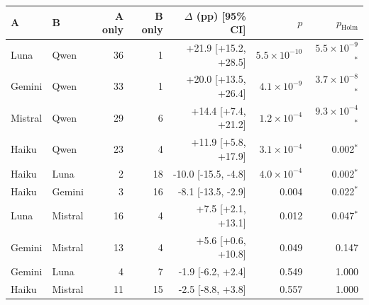 \begin{tabular}{@{}llrrrrr@{}}
\toprule
A & B & A only & B only & $\Delta$ (pp) [95\% CI] & $p$ & $p_\mathrm{Holm}$ \\
\midrule
Luna & Qwen & 36 & 1 & +21.9 [+15.2, +28.5] & $5.5\times10^{-10}$ & $5.5\times10^{-9}$$^{*}$ \\
Gemini & Qwen & 33 & 1 & +20.0 [+13.5, +26.4] & $4.1\times10^{-9}$ & $3.7\times10^{-8}$$^{*}$ \\
Mistral & Qwen & 29 & 6 & +14.4 [+7.4, +21.2] & $1.2\times10^{-4}$ & $9.3\times10^{-4}$$^{*}$ \\
Haiku & Qwen & 23 & 4 & +11.9 [+5.8, +17.9] & $3.1\times10^{-4}$ & 0.002$^{*}$ \\
Haiku & Luna & 2 & 18 & -10.0 [-15.5, -4.8] & $4.0\times10^{-4}$ & 0.002$^{*}$ \\
Haiku & Gemini & 3 & 16 & -8.1 [-13.5, -2.9] & 0.004 & 0.022$^{*}$ \\
Luna & Mistral & 16 & 4 & +7.5 [+2.1, +13.1] & 0.012 & 0.047$^{*}$ \\
Gemini & Mistral & 13 & 4 & +5.6 [+0.6, +10.8] & 0.049 & 0.147 \\
Gemini & Luna & 4 & 7 & -1.9 [-6.2, +2.4] & 0.549 & 1.000 \\
Haiku & Mistral & 11 & 15 & -2.5 [-8.8, +3.8] & 0.557 & 1.000 \\
\bottomrule
\end{tabular}

